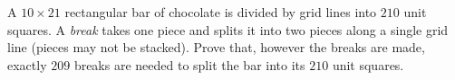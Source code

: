 A $10\times21$ rectangular bar of chocolate is divided by grid lines into $210$ unit squares. A \emph{break} takes one piece and splits it into two pieces along a single grid line (pieces may not be stacked). Prove that, however the breaks are made, exactly $209$ breaks are needed to split the bar into its $210$ unit squares.
